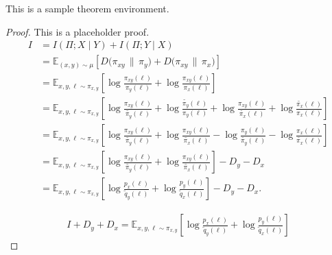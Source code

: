 \documentclass[11pt]{article}
\begin{document}
\begin{theorem}
This is a sample theorem environment.
\end{theorem}

\begin{proof}
This is a placeholder proof.
\begin{align*}
    I 
    &= I(\Pi; X \mid Y) + I(\Pi; Y \mid X) \\
    &= \mathbb{E}_{(x, y) \sim \mu} 
       \left[ D\big( \pi_{xy} \,\|\, \pi_y \big)
            + D\big( \pi_{xy} \,\|\, \pi_x \big) \right] \\
    &= \mathbb{E}_{x,y,\ell \sim \pi_{x,y}} 
        \left[
            \log \frac{\pi_{xy}(\ell)}{\pi_y(\ell)}
            + \log \frac{\pi_{xy}(\ell)}{\pi_x(\ell)}
        \right] \\
    &= \mathbb{E}_{x,y,\ell \sim \pi_{x,y}} 
       \left[
          \log \frac{\pi_{xy}(\ell)}{\tilde{\pi_y}(\ell)}
          + \log \frac{\tilde{\pi_y}(\ell)}{\pi_y(\ell)}
          + \log \frac{\pi_{xy}(\ell)}{\tilde{\pi_x}(\ell)}
          + \log \frac{\tilde{\pi_x}(\ell)}{\pi_x(\ell)}
       \right] \\
    &= \mathbb{E}_{x,y,\ell \sim \pi_{x,y}} 
       \left[
          \log \frac{\pi_{xy}(\ell)}{\tilde{\pi_y}(\ell)}
          + \log \frac{\pi_{xy}(\ell)}{\tilde{\pi_x}(\ell)}
          - \log \frac{\pi_y(\ell)}{\tilde{\pi_y}(\ell)}
          - \log \frac{\pi_x(\ell)}{\tilde{\pi_x}(\ell)}
       \right] \\
    &= \mathbb{E}_{x,y,\ell \sim \pi_{x,y}} 
       \left[
          \log \frac{\pi_{xy}(\ell)}{\tilde{\pi_y}(\ell)}
          + \log \frac{\pi_{xy}(\ell)}{\tilde{\pi_x}(\ell)}
        \right]
          - D_y
          - D_x
        \\       
    &= \mathbb{E}_{x,y,\ell \sim \pi_{x,y}} 
       \left[
          \log \frac{p_x(\ell)}{\tilde{q}_y(\ell)}
          + \log \frac{p_y(\ell)}{\tilde{q}_x(\ell)}
       \right]
       - D_y
       - D_x .
\end{align*}

\begin{align*}
    I + D_y + D_x = \mathbb{E}_{x,y,\ell \sim \pi_{x,y}} 
    \left[
       \log \frac{p_x(\ell)}{\tilde{q}_y(\ell)}
       + \log \frac{p_y(\ell)}{\tilde{q}_x(\ell)}
    \right]
\end{align*}
\end{proof}



\end{document}
